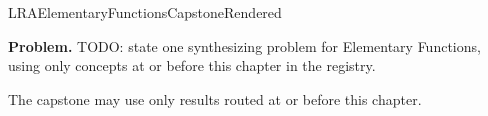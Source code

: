 \ifcsname LRAElementaryFunctionsCapstoneRendered\endcsname
\else
\expandafter\gdef\csname LRAElementaryFunctionsCapstoneRendered\endcsname{}

\newpage
{}
\label{cap:elementary-functions}

\begin{tcolorbox}[
  colback=gray!6,
  colframe=gray!40,
  arc=2pt,
  left=8pt, right=8pt, top=6pt, bottom=6pt,
  title={\small\textbf{Capstone Problem}},
  fonttitle=\small\bfseries
]
\textbf{Problem.}
TODO: state one synthesizing problem for Elementary Functions, using only concepts at or
before this chapter in the registry.
\end{tcolorbox}

\begin{remark*}
The capstone may use only results routed at or before this chapter.
\end{remark*}

\clearpage
\fi
